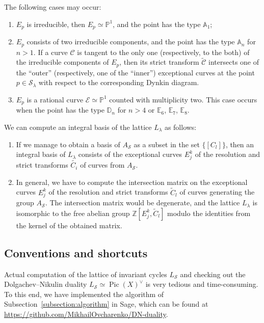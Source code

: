 \documentclass[10pt]{amsart}
\numberwithin{equation}{section}
\theoremstyle{plain}
\theoremstyle{definition}
\theoremstyle{remark}
\DeclareMathOperator{\Pic}{Pic}
\begin{document}
The following cases may occur:
\begin{enumerate}
\item \(E_p\) is irreducible, then \(E_p \simeq \mathbb{P}^1\), and the point has the type \(\mathbb{A}_1\);
\item \(E_p\) consists of two irreducible components, and the point has the type \(\mathbb{A}_n\) for \(n > 1\). If a curve \(\mathcal{C}\) is tangent to the only one (respectively, to the both) of the irreducible components of \(E_p\), then its strict transform \(\widetilde{\mathcal{C}}\) intersects one of the ``outer'' (respectively, one of the ``inner'') exceptional curves at the point \(p \in \mathcal{S}_{\lambda}\) with respect to the corresponding Dynkin diagram.
\item \(E_p\) is a rational curve \(\mathcal{E} \simeq \mathbb{P}^1\) counted with multiplicity two. This case occurs when the point has the type \(\mathbb{D}_n\) for \(n > 4\) or \(\mathbb{E}_6\), \(\mathbb{E}_7\), \(\mathbb{E}_8\).
\end{enumerate}

We can compute an integral basis of the lattice \(L_{\lambda}\) as follows:
\begin{enumerate}
\item If we manage to obtain a basis of \(A_{\mathcal{S}}\) as a subset in the set \(\{[C_l]\}\), then an integral basis of \(L_{\lambda}\) consists of the exceptional curves \(E_j^k\) of the resolution and strict transforms \(\widetilde{C_i}\) of curves from \(A_{\mathcal{S}}\).
\item In general, we have to compute the intersection matrix on the exceptional curves \(E_j^k\) of the resolution and strict transforms \(\widetilde{C}_l\) of curves generating the group \(A_{\mathcal{S}}\). The intersection matrix would be degenerate, and the lattice \(L_{\lambda}\) is isomorphic to the free abelian group \(\mathbb{Z}[E_j^k, \widetilde{C}_l]\) modulo the identities from the kernel of the obtained matrix.
\end{enumerate}

\subsection{Conventions and shortcuts}\label{subsection:conventions}

Actual computation of the lattice of invariant cycles \(L_{\mathcal{S}}\) and checking out the Dolgachev--Nikulin duality \(L_{\mathcal{S}} \simeq \Pic(X)^{\vee}\) is very tedious and time-consuming. To this end, we have implemented the algorithm of Subsection~\ref{subsection:algorithm} in Sage, which can be found at \url{https://github.com/MikhailOvcharenko/DN-duality}.
\end{document}
